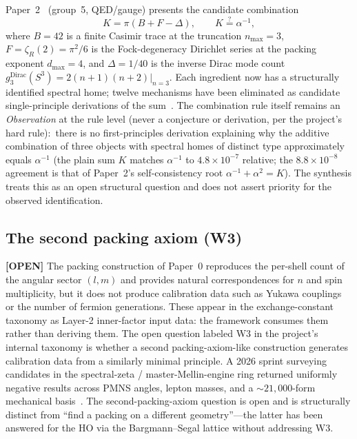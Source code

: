 \documentclass[aps,pra,twocolumn,superscriptaddress,longbibliography]{revtex4-2}
\newcommand{\gvc}[2]{#2}
\begin{document}
Paper~2~\cite{loutey_paper2_alpha} (group~5, QED/gauge) presents the
candidate combination
\begin{equation}
K = \pi (B + F - \Delta), \qquad K \stackrel{?}{=} \alpha^{-1},
\end{equation}
where $B = 42$ is a finite Casimir trace at the truncation $n_{\max} = 3$,
$F = \zeta_R(2) = \pi^2/6$ is the Fock-degeneracy Dirichlet series at
the packing exponent $d_{\max} = 4$, and $\Delta = 1/40$ is the
inverse Dirac mode count $g_3^{\text{Dirac}}(S^3) = 2(n+1)(n+2)|_{n=3}$.
Each ingredient now has a structurally identified spectral home;
twelve mechanisms have been eliminated as candidate single-principle
derivations of the sum~\cite{loutey_paper2_alpha}.  \gvc{k-combination-rule}{The combination rule
itself remains an \emph{Observation} at the rule level (never a
conjecture or derivation, per the project's hard rule):\ there is no
first-principles derivation explaining why the additive combination of
three objects with spectral homes of distinct type approximately equals
$\alpha^{-1}$ (the plain sum $K$ matches $\alpha^{-1}$ to
$4.8\times10^{-7}$ relative; the $8.8 \times 10^{-8}$ agreement is that
of Paper~2's self-consistency root $\alpha^{-1}+\alpha^{2}=K$)}.  The synthesis treats this as an open structural
question and does not assert priority for the observed identification.

\subsection*{The second packing axiom (W3)}

\textbf{[OPEN]} The packing construction of Paper~0 reproduces the per-shell count
of the angular sector $(l, m)$ and provides natural correspondences for $n$ and spin
multiplicity, but it does not produce calibration data such as Yukawa
couplings or the number of fermion generations.  These appear in the
exchange-constant taxonomy as Layer-2 inner-factor input data: the
framework consumes them rather than deriving them.  The open question
labeled W3 in the project's internal taxonomy is whether a second
packing-axiom-like construction generates calibration data from a
similarly minimal principle.  A 2026 sprint surveying candidates in the
spectral-zeta / master-Mellin-engine ring returned uniformly negative
results across PMNS angles, lepton masses, and a $\sim 21{,}000$-form
mechanical basis~\cite{loutey_paper34}.  The second-packing-axiom
question is open and is structurally distinct from ``find a packing on
a different geometry''---the latter has been answered for the HO via
the Bargmann--Segal lattice without addressing W3.
\end{document}

